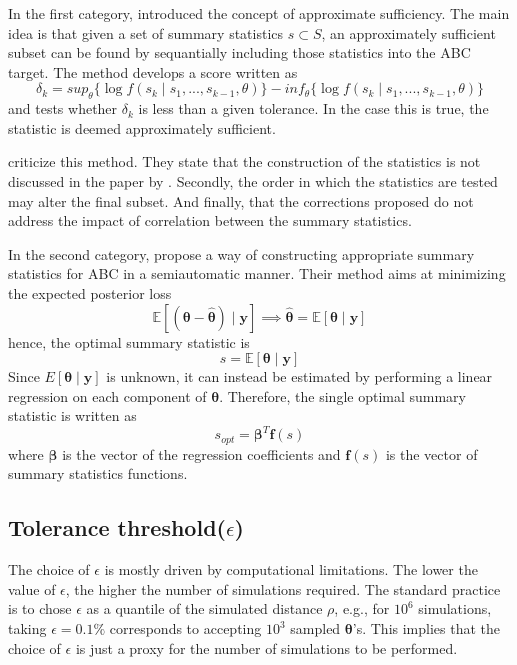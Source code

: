 \documentclass[runningheads]{llncs}
\begin{document}
In the first category, \citet{Joyce2008} introduced the concept
of approximate sufficiency. The main idea is that given a set
of summary statistics $s \subset S$, an approximately sufficient subset can
be found by sequantially including those statistics into the ABC
target. The method develops a score written as
\begin{equation}
\delta_k = sup_\theta \{
\log f(s_k \mid s_1,...,s_{k-1},\theta)
\}
- inf_\theta\{
\log f(s_k \mid s_1,...,s_{k-1},\theta)
\}
\end{equation}
and tests whether $\delta_k$ is less than a given tolerance. In the
case this is true, the statistic is deemed approximately sufficient.

\citet{Marin2012} criticize this method.
They state that the construction of the statistics is not
discussed in the paper by \citet{Joyce2008}. Secondly, the
order in which the statistics are tested may alter the final subset.
And finally, that the corrections proposed do not address the impact
of correlation between the summary statistics.

In the second category,
\citet{fearnhead2010constructing} propose a way of constructing
appropriate summary statistics for ABC in a semiautomatic manner.
Their method aims at minimizing the expected posterior loss
\begin{equation}
\mathbb E[(\bm\theta - \bm{\hat\theta})\mid \bm y]
\implies
\bm {\hat\theta} = \mathbb E[\bm\theta \mid \bm y]
\end{equation}
hence, the optimal summary statistic is
\begin{equation}
s = \mathbb E[\bm \theta \mid \bm y]
\end{equation}
Since $E[\bm \theta \mid \bm y]$ is unknown, it can instead
be estimated by performing a linear regression on each
component of $\bm \theta$. Therefore, the single optimal
summary statistic is written as
\begin{equation}
s_{opt} =  \bm\beta^T \bm f(s)
\end{equation}
where $\bm\beta$ is the vector of the regression coefficients and
$\bm f(s)$ is the vector of summary statistics functions.


\subsection{Tolerance threshold($\epsilon$)}
\label{subsec:statistical-summaries}
The choice of $\epsilon$ is mostly driven by computational
limitations. The lower the value of $\epsilon$, the higher
the number of simulations required. The standard practice
\citep{Beaumont2012} is to chose $\epsilon$ as a quantile
of the simulated distance $\rho$, e.g., for $10^6$ simulations,
taking $\epsilon = 0.1\%$ corresponds to accepting
$10^3$ sampled $\bm \theta$'s. This implies that the choice
of $\epsilon$ is just a proxy for the number of simulations
to be performed.
\end{document}
